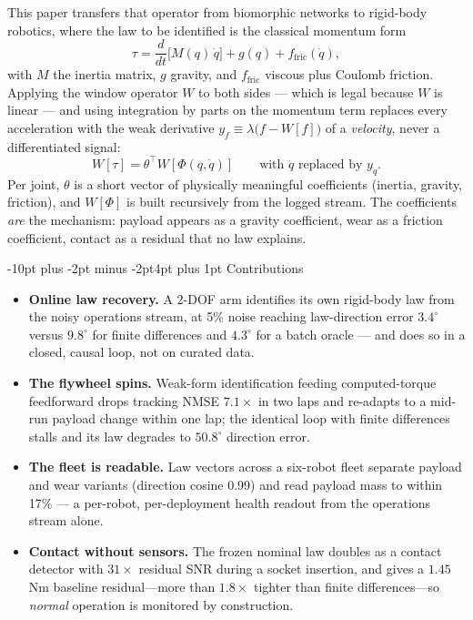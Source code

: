 \documentclass[10pt]{article}
\makeatletter
\renewcommand\subsection{\@startsection{subsection}{2}{\z@}%
  {-10pt plus -2pt minus -2pt}{4pt plus 1pt}%
  {\normalfont\bfseries\normalsize}}
\makeatother
\begin{document}
This paper transfers that operator from biomorphic networks to rigid-body
robotics, where the law to be identified is the classical momentum form
\begin{equation}
\tau = \frac{d}{dt}\big[M(q)\,\dot q\big] + g(q) + f_{\text{fric}}(\dot q),
\label{eq:momentum}
\end{equation}
with $M$ the inertia matrix, $g$ gravity, and $f_{\text{fric}}$ viscous plus
Coulomb friction. Applying the window operator $W$ to both sides --- which is
legal because $W$ is linear --- and using integration by parts on the momentum
term replaces every acceleration with the weak derivative
$y_f \equiv \lambda\big(f - W[f]\big)$ of a \emph{velocity}, never a
differentiated signal:
\begin{equation}
W[\tau] = \theta^\top W[\Phi(q,\dot q)] \qquad \text{with $\ddot q$ replaced by } y_{\dot q}.
\label{eq:weaklaw}
\end{equation}
Per joint, $\theta$ is a short vector of physically meaningful coefficients
(inertia, gravity, friction), and $W[\Phi]$ is built recursively from the
logged stream. The coefficients \emph{are} the mechanism: payload appears as a
gravity coefficient, wear as a friction coefficient, contact as a residual
that no law explains.

\subsection{Contributions}

\begin{itemize}
\item \textbf{Online law recovery.} A 2-DOF arm identifies its own rigid-body
law from the noisy operations stream, at 5\% noise reaching law-direction
error $3.4^\circ$ versus $9.8^\circ$ for finite differences and $4.3^\circ$
for a batch oracle --- and does so in a closed, causal loop, not on curated
data.
\item \textbf{The flywheel spins.} Weak-form identification feeding computed-torque
feedforward drops tracking NMSE $7.1\times$ in two laps and re-adapts to a
mid-run payload change within one lap; the identical loop with finite
differences stalls and its law degrades to $50.8^\circ$ direction error.
\item \textbf{The fleet is readable.} Law vectors across a six-robot fleet
separate payload and wear variants (direction cosine 0.99) and read payload
mass to within 17\% --- a per-robot, per-deployment health readout from the
operations stream alone.
\item \textbf{Contact without sensors.} The frozen nominal law doubles as a
contact detector with $31\times$ residual SNR during a socket insertion, and
gives a $1.45$\,Nm baseline residual---more than $1.8\times$ tighter than
finite differences---so \emph{normal} operation is monitored by construction.
\end{itemize}
\end{document}
